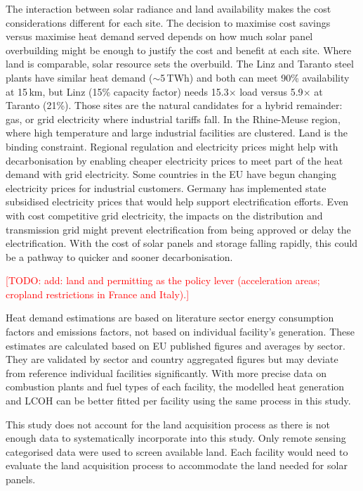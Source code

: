 \documentclass[11pt]{article}
\newcommand{\todo}[1]{\textcolor{red}{[TODO: #1]}}
\begin{document}
The interaction between solar radiance and land availability makes the cost considerations different for each site. The decision to maximise cost savings versus maximise heat demand served depends on how much solar panel overbuilding might be enough to justify the cost and benefit at each site. Where land is comparable, solar resource sets the overbuild. The Linz and Taranto steel plants have similar heat demand ($\sim$5\,TWh) and both can meet 90\% availability at 15\,km, but Linz (15\% capacity factor) needs 15.3$\times$ load versus 5.9$\times$ at Taranto (21\%). Those sites are the natural candidates for a hybrid remainder: gas, or grid electricity where industrial tariffs fall. In the Rhine-Meuse region, where high temperature and large industrial facilities are clustered. Land is the binding constraint. Regional regulation and electricity prices might help with decarbonisation by enabling cheaper electricity prices to meet part of the heat demand with grid electricity. Some countries in the EU have begun changing electricity prices for industrial customers. Germany has implemented state subsidised electricity prices that would help support electrification efforts\cite{wiedemann2026kpmg}. Even with cost competitive grid electricity, the impacts on the distribution and transmission grid might prevent electrification from being approved or delay the electrification. With the cost of solar panels and storage falling rapidly, this could be a pathway to quicker and sooner decarbonisation.

\todo{add: land and permitting as the policy lever (acceleration areas; cropland restrictions in France and Italy).}

Heat demand estimations are based on literature sector energy consumption factors and emissions factors, not based on individual facility's generation. These estimates are calculated based on EU published figures and averages by sector. They are validated by sector and country aggregated figures but may deviate from reference individual facilities significantly. With more precise data on combustion plants and fuel types of each facility, the modelled heat generation and LCOH can be better fitted per facility using the same process in this study.

This study does not account for the land acquisition process as there is not enough data to systematically incorporate into this study. Only remote sensing categorised data were used to screen available land. Each facility would need to evaluate the land acquisition process to accommodate the land needed for solar panels.
\end{document}
